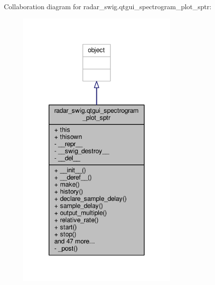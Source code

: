 Collaboration diagram for radar\+\_\+swig.\+qtgui\+\_\+spectrogram\+\_\+plot\+\_\+sptr\+:
\nopagebreak
\begin{figure}[H]
\begin{center}
\leavevmode
\includegraphics[width=227pt]{d1/d5a/classradar__swig_1_1qtgui__spectrogram__plot__sptr__coll__graph}
\end{center}
\end{figure}
